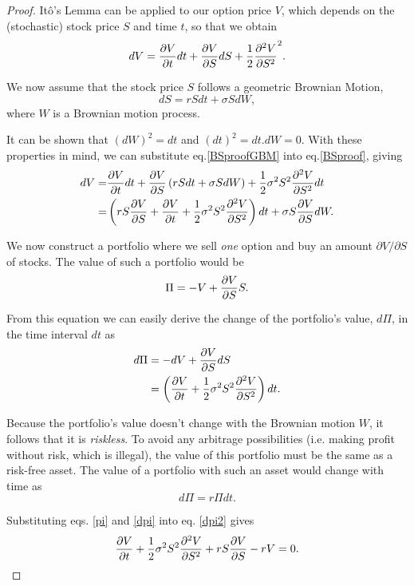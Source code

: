 \begin{proof}
Itô's Lemma can be applied to our option price $V$, which depends on the (stochastic) stock price $S$ and time $t$, so that we obtain
\begin{equation}\label{BSproof}
dV=\pdv{V}{t}dt+\pdv{V}{S}dS+\frac{1}{2}\pdv{^2V}{S^2} (dS)^2.
\end{equation}

We now assume that the stock price $S$ follows a geometric Brownian Motion,
\begin{equation}\label{BSproofGBM}
dS=rSdt+\sigma SdW,
\end{equation}
\noindent where $W$ is a Brownian motion process.

It can be shown that $(dW)^2=dt$ and $(dt)^2=dt.dW=0$. With these properties in mind, we can substitute eq.\eqref{BSproofGBM} into eq.\eqref{BSproof}, giving
\begin{equation}
\begin{split}
dV=&\pdv{V}{t}dt+\pdv{V}{S}\left(rSdt+\sigma SdW\right)+\frac{1}{2}\sigma^2S^2\pdv{^2V}{S^2}dt\\
=&\left(rS\pdv{V}{S}+\pdv{V}{t}+\frac{1}{2}\sigma^2S^2\pdv{^2V}{S^2}\right)dt+\sigma S\pdv{V}{S}dW.
\end{split}
\end{equation}


We now construct a portfolio where we sell \emph{one} option and buy an amount $\partial V/\partial S$ of stocks. The value of such a portfolio would be
\begin{equation}\label{pi}
\Pi=-V+\pdv{V}{S}S.
\end{equation}

From this equation we can easily derive the change of the portfolio's value, $d\Pi$, in the time interval $dt$ as
\begin{equation}\label{dpi}
\begin{split}
d\Pi&=-dV+\pdv{V}{S}dS\\
&=\left(\pdv{V}{t}+\frac{1}{2}\sigma^2S^2\pdv{^2V}{S^2}\right)dt.
\end{split}
\end{equation}

Because the portfolio's value doesn't change with the Brownian motion $W$, it follows that it is \emph{riskless}.
To avoid any arbitrage possibilities (i.e. making profit without risk, which is illegal), the value of this portfolio must be the same as a risk-free asset. The value of a portfolio with such an asset would change with time as
\begin{equation}\label{dpi2}
d\Pi=r\Pi dt.
\end{equation}

Substituting eqs. \eqref{pi} and \eqref{dpi} into eq. \eqref{dpi2} gives
\begin{equation}
\pdv{V}{t}+\frac{1}{2}\sigma^2S^2\pdv{^2V}{S^2}+rS\pdv{V}{S}-rV=0.
\end{equation}

\end{proof}


